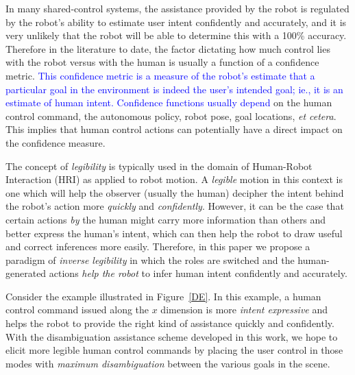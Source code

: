 \documentclass[conference]{IEEEtran}
\begin{document}
 In many shared-control systems, the assistance provided by the robot is regulated by the robot's ability to estimate user intent confidently and accurately, and it is very unlikely that the robot will be able to determine this with a 100\% accuracy.  Therefore in the literature to date, the factor dictating how much control lies with the robot versus with the human is usually a function of a confidence metric. \textcolor{blue}{This confidence metric is a measure of the robot's estimate that a particular goal in the environment is indeed the user's intended goal; ie., it is an estimate of human intent. Confidence functions usually depend} on the human control command, the autonomous policy, robot pose, goal locations, \textit{et cetera}. This implies that human control actions can potentially have a direct impact on the confidence measure. 

The concept of \textit{legibility} is typically used in the domain of Human-Robot Interaction (HRI) as applied to robot motion. A \textit{legible} motion in this context is one which will help the observer (usually the human) decipher the intent behind the robot's action more \textit{quickly} and \textit{confidently}. However, it can be the case that certain actions \textit{by} the human might carry more information than others and better express the human's intent, which can then help the robot to draw useful and correct inferences more easily. Therefore, in this paper we propose a paradigm of \textit{inverse legibility} in which the roles are switched and the human-generated actions \textit{help the robot} to infer human intent confidently and accurately. 

Consider the example illustrated in Figure~\ref{DE}. In this example, a human control command issued along the $x$ dimension is more \textit{intent expressive} and helps the robot to provide the right kind of assistance quickly and confidently. With the disambiguation assistance scheme developed in this work, we hope to elicit more legible human control commands by placing the user control in those modes with \textit{maximum disambiguation} between the various goals in the scene. 
\end{document}
